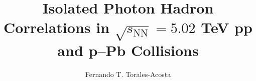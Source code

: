 \documentclass{ucbthesis}
\begin{document}

\title{Isolated Photon Hadron Correlations in $\sqrt{s_\mathrm{NN}}=5.02$ TeV pp and p--Pb Collisions}
\author{Fernando T. Torales-Acosta}

\maketitle
\copyrightpage


\end{document}
